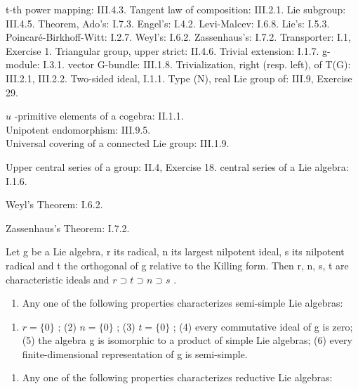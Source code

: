 t-th power mapping: III.4.3. Tangent law of composition: III.2.1. Lie subgroup: III.4.5. Theorem, Ado's: I.7.3. Engel's: I.4.2. Levi-Malcev: I.6.8. Lie's: I.5.3. Poincaré-Birkhoff-Witt: I.2.7. Weyl's: I.6.2. Zassenhaus's: I.7.2. Transporter: I.1, Exercise 1. Triangular group, upper strict: II.4.6. Trivial extension: I.1.7. g-module: I.3.1. vector G-bundle: III.1.8. Trivialization, right (resp. left), of T(G): III.2.1, III.2.2. Two-sided ideal, I.1.1. Type (N), real Lie group of: III.9, Exercise 29.

\(u\) -primitive elements of a cogebra: II.1.1.\\
Unipotent endomorphism: III.9.5.\\
Universal covering of a connected Lie group: III.1.9.

Upper central series of a group: II.4, Exercise 18. central series of a Lie algebra: I.1.6.

Weyl's Theorem: I.6.2.

Zassenhaus's Theorem: I.7.2.



Let g be a Lie algebra, r its radical, n its largest nilpotent ideal, s its nilpotent radical and t the orthogonal of g relative to the Killing form. Then r, n, s, t are characteristic ideals and \(r \supset t \supset n \supset s\) .

\begin{enumerate}
\def\labelenumi{(\Roman{enumi})}
\tightlist
\item
  Any one of the following properties characterizes semi-simple Lie algebras:
\end{enumerate}

\begin{enumerate}
\def\labelenumi{(\arabic{enumi})}
\tightlist
\item
  \(r = \{0\}\) ; (2) \(n = \{0\}\) ; (3) \(t = \{0\}\) ; (4) every commutative ideal of g is zero; (5) the algebra g is isomorphic to a product of simple Lie algebras; (6) every finite-dimensional representation of g is semi-simple.
\end{enumerate}

\begin{enumerate}
\def\labelenumi{(\Roman{enumi})}
\setcounter{enumi}{1}
\tightlist
\item
  Any one of the following properties characterizes reductive Lie algebras:
\end{enumerate}

